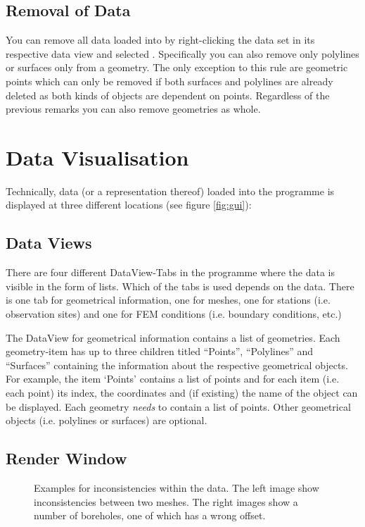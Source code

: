 \subsection{Removal of Data}

You can remove all data loaded into \ogs by right-clicking the data set in its respective data view and selected . Specifically you can also remove only polylines or surfaces only from a geometry. The only exception to this rule are geometric points which can only be removed if both surfaces and polylines are already deleted as both kinds of objects are dependent on points. Regardless of the previous remarks you can also remove geometries as whole.

\section{Data Visualisation}
\label{datavisualisation}

Technically, data (or a representation thereof) loaded into the programme is displayed at three different locations (see figure \ref{fig:gui}):

\subsection{Data Views}

There are four different DataView-Tabs in the programme where the data is visible in the form of lists. Which of the tabs is used depends on the data. There is one tab for geometrical information, one for meshes, one for stations (i.e. observation sites) and one for FEM conditions (i.e. boundary conditions, etc.)

The DataView for geometrical information contains a list of geometries. Each geometry-item has up to three children titled ``Points'', ``Polylines'' and ``Surfaces'' containing the information about the respective geometrical objects. For example, the item `Points' contains a list of points and for each item (i.e. each point) its index, the coordinates and (if existing) the name of the object can be displayed. Each geometry \emph{needs} to contain a list of points. Other geometrical objects (i.e. polylines or surfaces) are optional.

\subsection{Render Window}

\begin{figure}[tb]
\begin{center}
\enspace
{}
\end{center}
\caption{Examples for inconsistencies within the data. The left image show inconsistencies between two meshes. The right images show a number of boreholes, one of which has a wrong offset.} \label{fig:error}
\end{figure}


